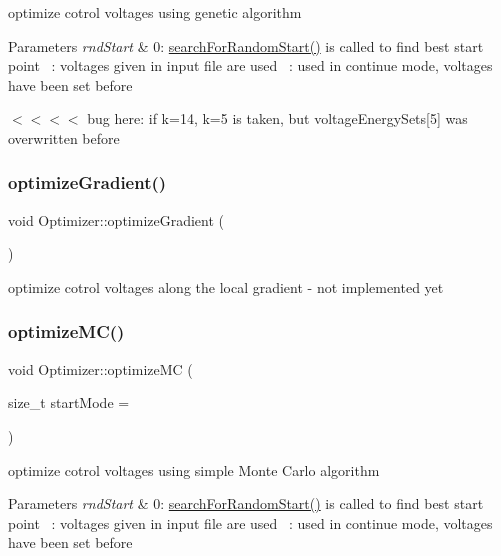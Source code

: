 optimize cotrol voltages using genetic algorithm 
\begin{DoxyParams}{Parameters}
{\em rnd\+Start} & 0\+: \hyperlink{classOptimizer_a5dfd9a3a649ffa7e064c49d00afdb384}{search\+For\+Random\+Start()} is called to find best start point ~\+: voltages given in input file are used ~\+: used in continue mode, voltages have been set before \\
\hline
\end{DoxyParams}
$<$$<$$<$$<$ bug here\+: if k=14, k=5 is taken, but voltage\+Energy\+Sets\mbox{[}5\mbox{]} was overwritten before \mbox{\label{classOptimizer_a29a003cd019aa5908d1bb2bd317b1589}} 
\subsubsection{\texorpdfstring{optimize\+Gradient()}{optimizeGradient()}}
{\footnotesize\ttfamily void Optimizer\+::optimize\+Gradient (\begin{DoxyParamCaption}{ }\end{DoxyParamCaption})\hspace{0.3cm}{\ttfamily [private]}}

optimize cotrol voltages along the local gradient -\/ not implemented yet \mbox{\label{classOptimizer_a70cfb2468659d3d06d2fb7ba959c1f67}} 
\subsubsection{\texorpdfstring{optimize\+M\+C()}{optimizeMC()}}
{\footnotesize\ttfamily void Optimizer\+::optimize\+MC (\begin{DoxyParamCaption}\item[{size\+\_\+t}]{start\+Mode = {} }\end{DoxyParamCaption})\hspace{0.3cm}{\ttfamily [private]}}

optimize cotrol voltages using simple Monte Carlo algorithm 
\begin{DoxyParams}{Parameters}
{\em rnd\+Start} & 0\+: \hyperlink{classOptimizer_a5dfd9a3a649ffa7e064c49d00afdb384}{search\+For\+Random\+Start()} is called to find best start point ~\+: voltages given in input file are used ~\+: used in continue mode, voltages have been set before \\
\hline
\end{DoxyParams}
\mbox{\label{classOptimizer_aa9fdb7cd911fdd9fbfaf3fc8d86ea408}} 
